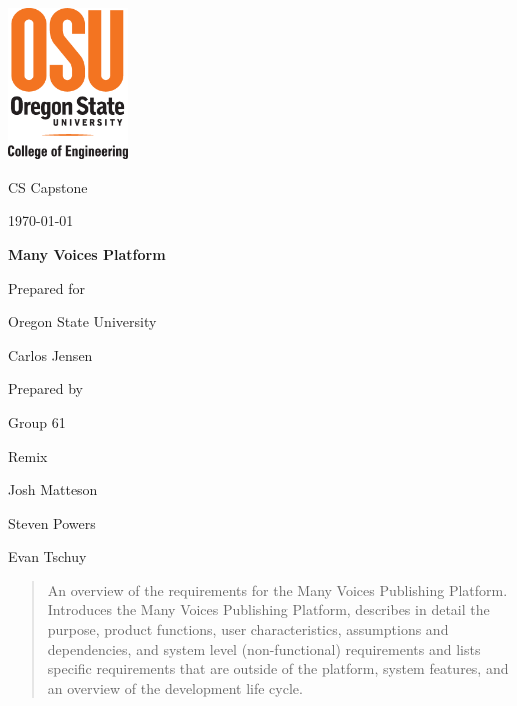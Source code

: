 \documentclass[onecolumn, draftclsnofoot,10pt, compsoc]{IEEEtran}
\def \CapstoneTeamName{		Remix}
\def \CapstoneTeamNumber{		61}
\def \GroupMemberOne{			Josh Matteson}
\def \GroupMemberTwo{			Steven Powers}
\def \GroupMemberThree{			Evan Tschuy}
\def \CapstoneProjectName{		Many Voices Platform}
\def \CapstoneSponsorCompany{	Oregon State University}
\def \CapstoneSponsorPerson{		Carlos Jensen}
\def \DocType{
				}
\newcommand{\NameSigPair}[1]{\par
\makebox[2.75in][r]{#1} \hfil 	\makebox[3.25in]{\makebox[2.25in]{\hrulefill} \hfill		\makebox[.75in]{\hrulefill}}
\par\vspace{-12pt} \textit{\tiny\noindent
\makebox[2.75in]{} \hfil		\makebox[3.25in]{\makebox[2.25in][r]{Signature} \hfill	\makebox[.75in][r]{Date}}}}
\renewcommand{\NameSigPair}[1]{#1}
\begin{document}
\begin{titlepage}
    \begin{singlespace}
    	\includegraphics[height=4cm]{coe_v_spot1}
        \hfill
        \par\vspace{.2in}
        \centering
        \scshape{
            \huge CS Capstone \DocType \par
            {\large\today}\par
            \vspace{.5in}
            \textbf{\Huge\CapstoneProjectName}\par
            \vfill
            {\large Prepared for}\par
            \Huge \CapstoneSponsorCompany\par
            \vspace{5pt}
            {\Large\NameSigPair{\CapstoneSponsorPerson}\par}
            {\large Prepared by }\par
            Group\CapstoneTeamNumber\par
            \CapstoneTeamName\par
            \vspace{5pt}
            {\Large
                \NameSigPair{\GroupMemberOne}\par
                \NameSigPair{\GroupMemberTwo}\par
                \NameSigPair{\GroupMemberThree}\par
            }
            \vspace{20pt}
        }
        \begin{abstract}
		\noindent An overview of the requirements for the Many Voices Publishing Platform.
		Introduces the Many Voices Publishing Platform, describes in detail the purpose,
		product functions, user characteristics, assumptions and dependencies,
		and system level (non-functional) requirements and lists specific requirements
		that are outside of the platform, system features, and an overview of the
		development life cycle.
        \end{abstract}
    \end{singlespace}
\end{titlepage}
\newpage
{}
\tableofcontents
\clearpage
\end{document}
